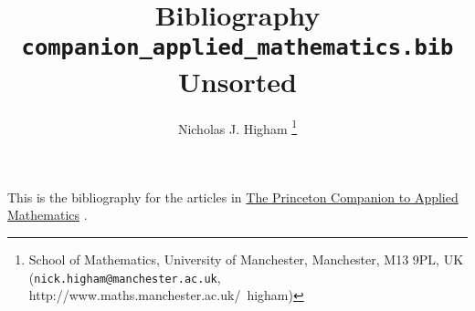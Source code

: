 \documentclass[12pt]{article}
\title{Bibliography \texttt{companion\_applied\_mathematics.bib} Unsorted}
\author{Nicholas J. Higham%
        \thanks{%
                School of Mathematics,
                University of Manchester,
                Manchester, M13 9PL, UK 
                (\texttt{nick.higham@manchester.ac.uk},
                http://www.maths.manchester.ac.uk/\string~higham)
               }
}
\begin{document}
\maketitle

This is the bibliography for the articles in 
\href{http://www.ma.man.ac.uk/~higham/pcam/index.php}{The Princeton Companion to Applied Mathematics} \cite{higham15PCAM}.


\nocite{*}



\end{document}
